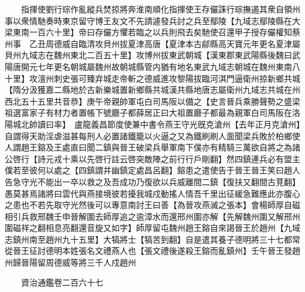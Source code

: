 　　指揮使劉行琮作亂縱兵焚掠將奔淮南順化指揮使王存儼誅行琮撫遏其衆自領州事以衆情馳奏時東京留守博王友文不先請遽發兵討之兵至鄢陵【九域志鄢陵縣在大梁東南一百六十里】帝曰存儼方懼若臨之以兵則飛去矣馳使召還甲子授存儼權知蔡州事　乙丑周德威自臨清攻貝州拔夏津高唐【夏津本古鄃縣高天寶元年更名夏津屬貝州九域志在魏州東北二百五十里】攻博州拔東武朝城【漢東郡東武陽縣後魏曰武陽唐開元七年更名朝城屬魏州故朝城縣管内猶有地名東武九域志朝城在魏州東南八十里】攻澶州刺史張可臻弃城走帝斬之德威進攻黎陽拔臨河淇門逼衛州掠新鄉共城【隋分汲獲嘉二縣地於古新樂城置新鄉縣共城漢共縣地唐志屬衛州九域志共城在州西北五十五里共音恭】庚午帝親帥軍屯白司馬阪以備之【史言晉兵乘勝聲勢之盛梁祖選富家子有材力者置帳下號廳子都薛居正曰大祖置廳子都最為親軍白司馬阪在洛陽城北帥讀曰率】　盧龍義昌節度使兼中書令燕王守光旣克滄州【去年正月克滄州】自謂得天助淫虐滋甚每刑人必置諸鐵籠以火逼之又為鐵刷刷人面聞梁兵敗於柏鄉使人謂趙王鎔及王處直曰聞二鎮與晉王破梁兵舉軍南下僕亦有精騎三萬欲自將之為諸公啓行【詩元戎十乘以先啓行註云啓突敵陣之前行行戶剛翻】然四鎮連兵必有盟主僕若至彼何以處之【四鎮謂并幽鎮定處昌呂翻】鎔患之遣使告于晉王晉王笑曰趙人告急守光不能出一卒以救之及吾成功乃復欲以兵威離間二鎮【復扶又翻間古莧翻】愚莫甚焉諸將曰雲代與燕接境彼若擾我城戍動搖人情吾千里出征緩急難應此亦腹心之患也不若先取守光然後可以專意南討王曰善【為晉攻燕滅之張本】會楊師厚自磁相引兵救邢魏壬申晉解圍去師厚追之逾漳水而還邢州圍亦解【先解魏州圍又解邢州圍磁祥之翻相息亮翻還音旋又如字】師厚留屯魏州趙王鎔自來謁晉王於趙州【九域志鎮州南至趙州九十五里】大犒將士【犒苦到翻】自是遣其養子德明將三十七都常從晉王征討德明本姓張名文禮燕人也【張文禮後遂殺王鎔而亂鎮州】壬午晉王發趙州歸晉陽留周德威等將三千人戍趙州

　　資治通鑑卷二百六十七  
    


 


 



 

 
  







 


　　
　　
　
　
　


　　

　















